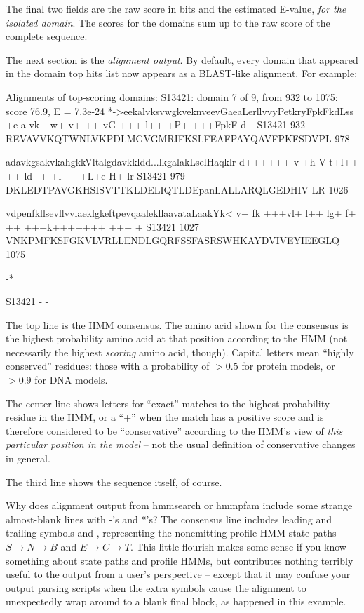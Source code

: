 The final two fields are the raw score in bits and the estimated
E-value, \emph{for the isolated domain}.  The scores for the domains
sum up to the raw score of the complete sequence.

The next section is the \emph{ alignment output}. By default, every
domain that appeared in the domain top hits list now appears as a
BLAST-like alignment. For example:

\begin{sreoutput}
Alignments of top-scoring domains:
S13421: domain 7 of 9, from 932 to 1075: score 76.9, E = 7.3e-24
                   *->eekalvksvwgkveknveevGaeaLerllvvyPetkryFpkFkdLss
                      +e a vk+ w+ v+ ++  vG  +++ l++ +P+ +++FpkF d+  
      S13421   932    REVAVVKQTWNLVKPDLMGVGMRIFKSLFEAFPAYQAVFPKFSDVPL 978  

                   adavkgsakvkahgkkVltalgdavkkldd...lkgalakLselHaqklr
                    d++++++ v +h   V t+l++ ++ ld++ +l+   ++L+e H+  lr
      S13421   979 -DKLEDTPAVGKHSISVTTKLDELIQTLDEpanLALLARQLGEDHIV-LR 1026 

                   vdpenfkllsevllvvlaeklgkeftpevqaalekllaavataLaakYk<
                   v+   fk +++vl+  l++ lg+ f+  ++ +++k+++++++ +++  + 
      S13421  1027 VNKPMFKSFGKVLVRLLENDLGQRFSSFASRSWHKAYDVIVEYIEEGLQ  1075 

                   -*
                     
      S13421     -    -    
\end{sreoutput}

The top line is the HMM consensus. The amino acid shown for the
consensus is the highest probability amino acid at that position
according to the HMM (not necessarily the highest \emph{ scoring} amino
acid, though). Capital letters mean ``highly conserved'' residues:
those with a probability of $> 0.5$ for protein models, or $> 0.9$ for
DNA models. 

The center line shows letters for ``exact'' matches to the highest
probability residue in the HMM, or a ``+'' when the match has a
positive score and is therefore considered to be ``conservative''
according to the HMM's view of \emph{ this particular position in the
model} -- not the usual definition of conservative changes in general.

The third line shows the sequence itself, of course.

\begin{srefaq}{Why does alignment output from hmmsearch or
hmmpfam include some strange almost-blank lines with -'s and *'s?}  
The consensus line includes leading and
trailing symbols \prog{*->} and \prog{<-*}, representing the
nonemitting profile HMM state paths $S \rightarrow N \rightarrow B$
and $E \rightarrow C \rightarrow T$. This little flourish makes some
sense if you know something about state paths and profile HMMs, but
contributes nothing terribly useful to the output from a user's
perspective -- except that it may confuse your output parsing scripts
when the extra symbols cause the alignment to unexpectedly wrap around
to a blank final block, as happened in this example.
\end{srefaq}

